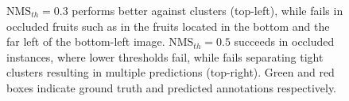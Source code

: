 \begin{figure}[!ht]
  \centering
  
  \caption{$\text{NMS}_{th}=0.3$ performs better against clusters (top-left), while fails in occluded fruits such as in the fruits located in the bottom and the far left of the bottom-left image. $\text{NMS}_{th}=0.5$ succeeds in occluded instances, where lower thresholds fail, while fails separating tight clusters resulting in multiple predictions (top-right). Green and red boxes indicate ground truth and predicted annotations respectively.}
  \label{ch5:fig6}
\end{figure}

